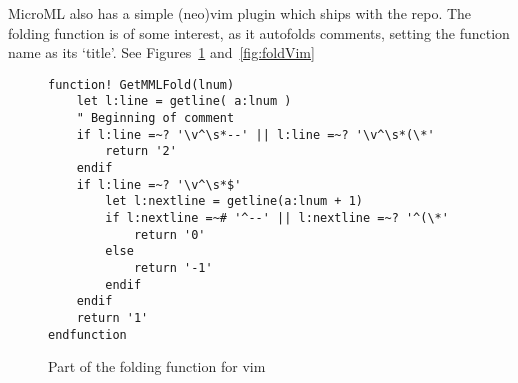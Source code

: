 MicroML also has a simple (neo)vim plugin which ships with the repo. The folding function is of some
interest, as it autofolds comments, setting the function name as its `title'. See
Figures~\ref{fig:fold} and~\ref{fig:foldVim}
\begin{figure}
    \begin{verbatim}
function! GetMMLFold(lnum) 
    let l:line = getline( a:lnum )
    " Beginning of comment
    if l:line =~? '\v^\s*--' || l:line =~? '\v^\s*(\*'
        return '2'
    endif
    if l:line =~? '\v^\s*$'
        let l:nextline = getline(a:lnum + 1)
        if l:nextline =~# '^--' || l:nextline =~? '^(\*'
            return '0'
        else
            return '-1'
        endif
    endif
    return '1'
endfunction 
    \end{verbatim}
    \caption{Part of the folding function for vim}
\label{fig:fold}
\end{figure}
